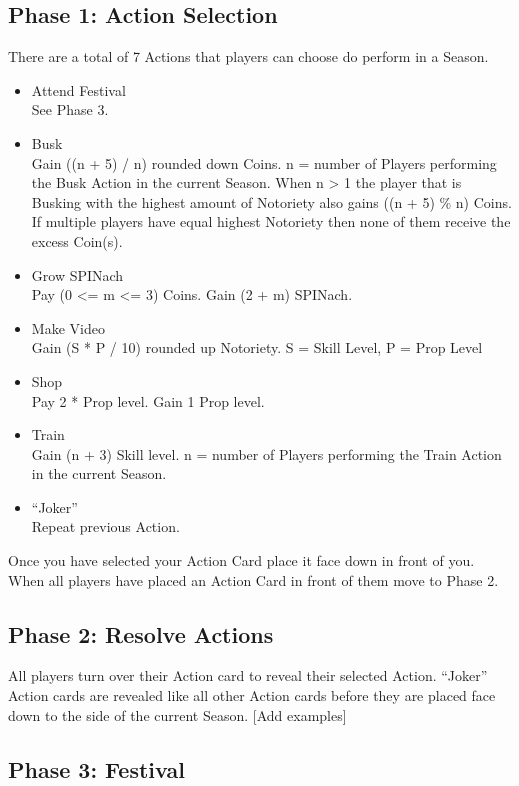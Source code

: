 		\subsection{Phase 1: Action Selection}
			There are a total of 7 Actions that players can choose do perform in a Season.
			\begin{itemize}
				\item {Attend Festival}\hfill \\
					See Phase 3.
				\item {Busk}\hfill \\
					Gain ((n + 5) / n) rounded down Coins. n = number of Players performing the Busk Action in the current Season.
					When n > 1 the player that is Busking with the highest amount of Notoriety also gains ((n + 5) \% n) Coins.
					If multiple players have equal highest Notoriety then none of them receive the excess Coin(s).
				\item {Grow SPINach}\hfill \\
					Pay (0 \textless= m \textless= 3) Coins. Gain (2 + m) SPINach. 
				\item {Make Video}\hfill \\
					Gain (S * P / 10) rounded up Notoriety. S = Skill Level, P = Prop Level
				\item {Shop}\hfill \\
					Pay 2 * Prop level. Gain 1 Prop level.
				\item {Train}\hfill \\
					Gain (n + 3) Skill level. n = number of Players performing the Train Action in the current Season.
				\item {``Joker''}\hfill \\
					Repeat previous Action.
			\end{itemize}
			Once you have selected your Action Card place it face down in front of you.
			When all players have placed an Action Card in front of them move to Phase 2.
		\subsection{Phase 2: Resolve Actions}
			All players turn over their Action card to reveal their selected Action.
			``Joker'' Action cards are revealed like all other Action cards before they are placed face down to the side of the current Season.
			[Add examples]
		\subsection{Phase 3: Festival}
